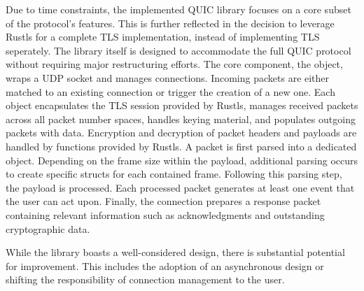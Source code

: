 Due to time constraints, the implemented QUIC library focuses on a core subset of the protocol's features. This is further reflected
in the decision to leverage Rustls for a complete TLS implementation, instead of implementing TLS seperately. The library itself
is designed to accommodate the full QUIC protocol without requiring major restructuring efforts.
The core component, the  object, wraps a UDP socket and manages connections. Incoming packets are either matched
to an existing connection or trigger the creation of a new one. Each  object encapsulates the TLS session
provided by Rustls, manages received packets across all packet number spaces, handles keying material, and populates outgoing packets
with data. Encryption and decryption of packet headers and payloads are handled by functions provided by Rustls.
A packet is first parsed into a dedicated  object. Depending on the frame size within the payload, additional parsing
occurs to create specific structs for each contained frame. Following this parsing step, the payload is processed. Each processed
packet generates at least one event that the user can act upon. Finally, the connection prepares a response packet containing
relevant information such as acknowledgments and outstanding cryptographic data.

While the library boasts a well-considered design, there is substantial potential for improvement. This includes the adoption of
an asynchronous design or shifting the responsibility of connection management to the user.